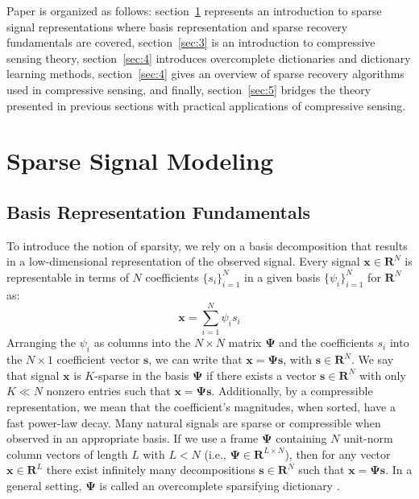 \documentclass[journal]{IEEEtran}
\begin{document}
Paper is organized as follows: section~\ref{sec:2} represents an introduction to sparse signal representations where basis representation and sparse recovery fundamentals are covered, section~\ref{sec:3} is an introduction to compressive sensing theory, section~\ref{sec:4} introduces overcomplete dictionaries and dictionary learning methods, section~\ref{sec:4} gives an overview of sparse recovery algorithms used in compressive sensing, and finally, section~\ref{sec:5} bridges the theory presented in previous sections with practical applications of compressive sensing.

\section{Sparse Signal Modeling} \label{sec:2}
\subsection{Basis Representation Fundamentals}
To introduce the notion of sparsity, we rely on a basis decomposition that results in a low-dimensional representation of the observed signal. Every signal $\boldsymbol{x}\in\mathbf{R}^N$ is representable in terms of $N$ coefficients $\{s_i\}_{i=1}^N$ in a given basis $\{\psi_i\}_{i=1}^{N}$ for $\mathbf{R}^N$ as:
%
\begin{equation} \label{eq:basis_rep}
	\boldsymbol{x}= \sum\limits_{i=1}^N {\psi}_i {s}_i
\end{equation}
%
Arranging the ${\psi}_i$ as columns into the $N\times N$ matrix $\boldsymbol{\Psi}$ and the coefficients $s_i$ into the $N\times 1$ coefficient vector $\boldsymbol{s}$, we can write that $\boldsymbol{x}=\boldsymbol{\Psi} \boldsymbol{s}$, with $\boldsymbol{s}\in\mathbf{R}^N$. We say that signal $\boldsymbol{x}$ is $K$-sparse in the basis $\boldsymbol{\Psi}$ if there exists a vector $\boldsymbol{s}\in\mathbf{R}^N$ with only $K\ll N$ nonzero entries such that $\boldsymbol{x}=\boldsymbol{\Psi} \boldsymbol{s}$. Additionally, by a compressible representation, we mean that the coefficient's magnitudes, when sorted, have a fast power-law decay. Many natural signals are sparse or compressible when observed in an appropriate basis. If we use a frame $\boldsymbol{\Psi}$ containing $N$ unit-norm column vectors of length $L$ with $L<N$ (i.e., $\boldsymbol{\Psi}\in \mathbf{R}^{L\times N}$), then for any  vector $\boldsymbol{x}\in \mathbf{R}^L$ there exist infinitely many decompositions $\boldsymbol{s} \in \mathbf{R}^N$ such that $\boldsymbol{x}=\boldsymbol{\Psi} \boldsymbol{s}$. In a general setting, $\boldsymbol{\Psi}$ is called an overcomplete sparsifying dictionary \cite{Duarte2011}.
\end{document}
